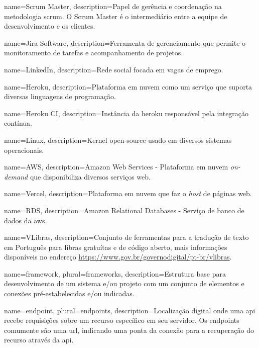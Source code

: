 
 {
	name=Scrum Master,
	description={Papel de gerência e coordenação na metodologia \gls{scrum}. O Scrum Master é o intermediário entre a equipe de desenvolvimento e os clientes.}
}

 {
	name=Jira Software,
	description={Ferramenta de gerenciamento que permite o monitoramento de tarefas e acompanhamento de projetos.}
}   

 {
	name=LinkedIn,
	description={Rede social focada em vagas de emprego.}
}   

 {
	name=Heroku,
	description={Plataforma em nuvem como um serviço que suporta diversas linguagens de programação.}
} 

 {
	name=Heroku CI,
	description={Instância da \gls{heroku} responsável pela integração contínua.}
} 

 {
	name=Linux,
	description={Kernel open-source usado em diversos sistemas operacionais.}
}   

 {
	name=AWS,
	description={Amazon Web Services - Plataforma em nuvem \emph{on-demand} que disponibiliza diversos serviços web.}
}    

 {
	name=Vercel,
	description={Plataforma em nuvem que faz o \emph{host} de páginas web.}
}  

 {
	name=RDS,
	description={Amazon Relational Databases - Serviço de banco de dados da \gls{aws}.}
}

 {
	name=VLibras,
	description={Conjunto de ferramentas para a tradução de texto em Português para \ac{libras} gratuítas e de código aberto, mais informações disponíveis no endereço \url{https://www.gov.br/governodigital/pt-br/vlibras}.}
}

 {
	name=framework,
	plural=frameworks,
	description={Estrutura base para desenvolvimento de um sistema e/ou projeto com um conjunto de elementos e conexões pré-estabelecidas e/ou indicadas.}
}

 {
	name=endpoint,
	plural=endpoints,
	description={Localização digital onde uma \ac{api} recebe requisições sobre um recurso específico em seu servidor. Os endpoints comumente são uma \ac{url}, indicando uma ponta da conexão para a recuperação do recurso através da \ac{api}.}
}

